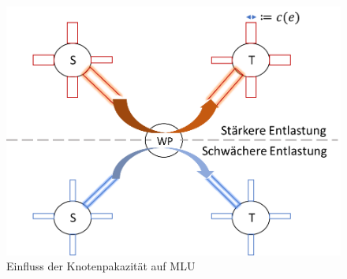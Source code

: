 \documentclass[sigconf,noacm,review]{acmart}
\begin{document}
\begin{figure}[h]
  \centering 
  \includegraphics[width=\linewidth]{abbildungen/kWPO_Capacity.png}
  \caption{Einfluss der Knotenpakazität auf MLU}
 \end{figure}
\end{document}
